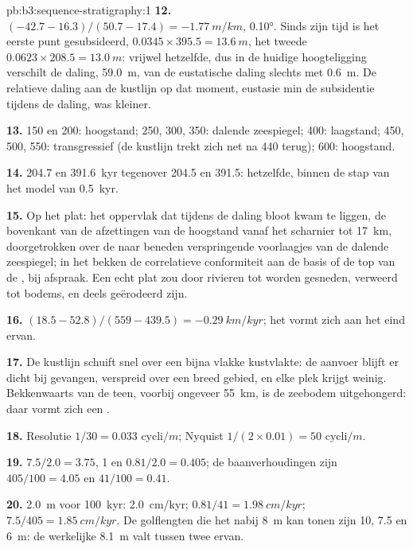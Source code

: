\begin{solution}{pb:b3:sequence-stratigraphy:1}
\textbf{12.} $(-42.7 - 16.3)/(50.7 - 17.4) = \qty{-1.77}{m/km}$, \ang{0.10}.
Sinds zijn tijd is het eerste punt gesubsideerd, $0.0345\times395.5 =
\qty{13.6}{m}$, het tweede $0.0623\times208.5 = \qty{13.0}{m}$: vrijwel
hetzelfde, dus in de huidige hoogteligging verschilt de daling, \qty{59.0}{m},
van de eustatische daling slechts met \qty{0.6}{m}. De relatieve daling aan de
kustlijn op dat moment, eustasie min de subsidentie tijdens de daling, was kleiner.

\textbf{13.} 150 en 200: hoogstand; 250, 300, 350: dalende zeespiegel; 400:
laagstand; 450, 500, 550: transgressief (de kustlijn trekt zich net na
440 terug); 600: hoogstand.

\textbf{14.} 204.7 en \qty{391.6}{kyr} tegenover 204.5 en 391.5: hetzelfde,
binnen de stap van het model van \qty{0.5}{kyr}.

\textbf{15.} Op het plat: het oppervlak dat tijdens de daling bloot kwam te liggen, de bovenkant van
de afzettingen van de hoogstand vanaf het scharnier tot \qty{17}{km}, doorgetrokken over de
naar beneden verspringende voorlaagjes van de dalende zeespiegel; in het bekken de correlatieve
conformiteit aan de basis of de top van de , bij afspraak. Een
echt plat zou door rivieren tot  worden gesneden, verweerd tot bodems,
en deels geërodeerd zijn.

\textbf{16.} $(18.5 - 52.8)/(559 - 439.5) = \qty{-0.29}{km/kyr}$; het
 vormt zich aan het eind ervan.

\textbf{17.} De kustlijn schuift snel over een bijna vlakke kustvlakte: de
aanvoer blijft er dicht bij gevangen, verspreid over een breed gebied, en elke
plek krijgt weinig. Bekkenwaarts van de teen, voorbij ongeveer \qty{55}{km}, is
de zeebodem uitgehongerd: daar vormt zich een .

\textbf{18.} Resolutie $1/30 = \num{0.033}\text{ cycli}/\unit{m}$; Nyquist $1/(2\times
0.01) = \num{50}\text{ cycli}/\unit{m}$.

\textbf{19.} $7.5/2.0 = 3.75$, 1 en $0.81/2.0 = 0.405$; de baanverhoudingen
zijn $405/100 = 4.05$ en $41/100 = 0.41$.

\textbf{20.} \qty{2.0}{m} voor \qty{100}{kyr}: \qty{2.0}{cm/kyr}; $0.81/41 =
\qty{1.98}{cm/kyr}$; $7.5/405 = \qty{1.85}{cm/kyr}$. De golflengten die het
 nabij \qty{8}{m} kan tonen zijn 10, 7.5 en \qty{6}{m}: de werkelijke
\qty{8.1}{m} valt tussen twee ervan.


\end{solution}
